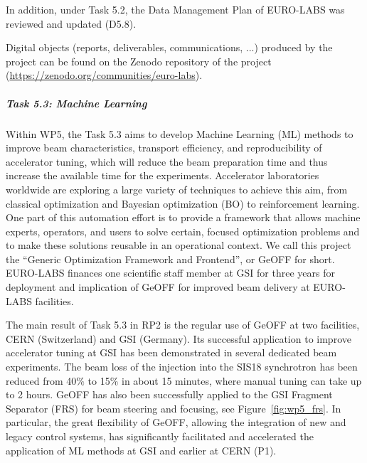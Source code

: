 In addition, under Task 5.2, the Data Management Plan of EURO-LABS was reviewed and updated (D5.8).


Digital objects (reports, deliverables, communications, ...) produced by the project can be found on the Zenodo repository of the project (\url{https://zenodo.org/communities/euro-labs}). 

\subparagraph{Task 5.3: Machine Learning} \mbox{} 


Within WP5, the Task 5.3 aims to develop Machine Learning (ML) methods to improve beam characteristics, transport efficiency, and reproducibility of accelerator tuning, which will reduce the beam preparation time and thus increase the available time for the experiments. Accelerator laboratories worldwide are exploring a large variety of techniques to achieve this aim, from classical optimization and Bayesian optimization (BO) to reinforcement learning. One part of this automation effort is to provide a framework that allows machine experts, operators, and users to solve certain, focused optimization problems and to make these solutions reusable in an operational context. We call this project the “Generic Optimization Framework and Frontend”, or GeOFF for short.  EURO-LABS finances one scientific staff
member at GSI for three years for deployment and implication of GeOFF for improved beam delivery at EURO-LABS facilities.

The main result of Task 5.3 in RP2 is the regular use of GeOFF at two facilities, CERN (Switzerland) and GSI (Germany). Its successful application to improve accelerator tuning at GSI has been demonstrated in several dedicated beam experiments. The beam loss of the injection into the SIS18 synchrotron has been reduced from 40$\%$ to 15$\%$ in about 15 minutes, where manual tuning can take up to 2 hours. GeOFF has also been successfully applied to the GSI Fragment Separator (FRS) for beam steering and focusing, see Figure~\ref{fig:wp5_frs}. In particular, the great flexibility of GeOFF, allowing the integration of new and legacy control systems, has significantly facilitated and accelerated the application of ML methods at GSI and earlier at CERN (P1). 

